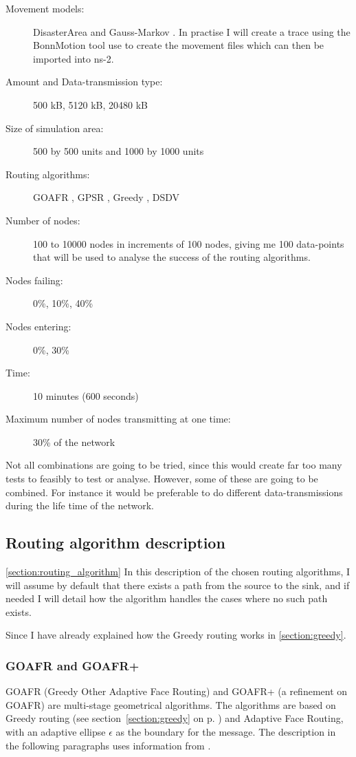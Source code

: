 \begin{description}
\item[Movement models:] DisasterArea \cite{disasterArea} and Gauss-Markov \cite{MobilityAdHocResearch}. In practise I will create a trace using the BonnMotion tool \cite{toilers} use to create the movement files which can then be imported into ns-2.
\item[Amount and Data-transmission type:] 500 kB, 5120 kB, 20480 kB
\item[Size of simulation area:] 500 by 500 units and 1000 by 1000 units
\item[Routing algorithms:] GOAFR \cite{gopher}, GPSR \cite{gpsr}, Greedy \cite{gopher}, DSDV \cite{DSDV}
\item[Number of nodes:] 100 to 10000 nodes in increments of 100 nodes, giving me 100 data-points that will be used to analyse the success of the routing algorithms. 
\item[Nodes failing:] 0\%, 10\%, 40\%
\item[Nodes entering:] 0\%, 30\%
\item[Time:] 10 minutes (600 seconds)
\item[Maximum number of nodes transmitting at one time:] 30\% of the network
\end{description}

Not all combinations are going to be tried, since this would create far too many tests to feasibly to test or analyse. However, some of these are going to be combined. For instance it would be preferable to do different data-transmissions during the life time of the network.

\subsection{Routing algorithm description}
\ref{section:routing_algorithm}
In this description of the chosen routing algorithms, I will assume by default that there exists a path from the source to the sink, and if needed I will detail how the algorithm handles the cases where no such path exists.

Since I have already explained how the Greedy routing works in \ref{section:greedy}.

\subsubsection{GOAFR and GOAFR+}

GOAFR \cite{gopher} (Greedy Other Adaptive Face Routing) and GOAFR+ \cite{gopher+} (a refinement on GOAFR) are multi-stage geometrical algorithms. The algorithms are based on Greedy routing (see section~\ref{section:greedy} on p. \pageref{section:greedy}) and Adaptive Face Routing, with an adaptive ellipse $\epsilon$ as the boundary for the message. The description in the following paragraphs uses information from \cite{gopher}.

